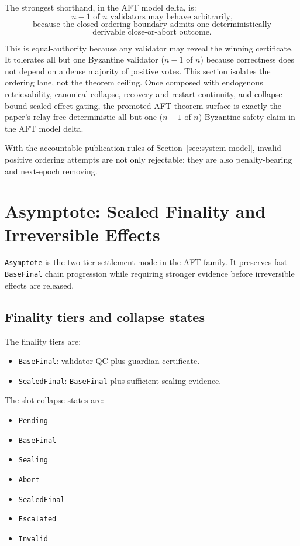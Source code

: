 \documentclass[11pt]{article}
\newcommand{\AFT}{\textsc{AFT}}
\newcommand{\code}[1]{\texttt{#1}}
\begin{document}
The strongest shorthand, in the AFT model delta, is:
\[
n-1 \text{ of } n \text{ validators may behave arbitrarily,}
\]
\[
\text{because the closed ordering boundary admits one deterministically}
\]
\[
\text{derivable close-or-abort outcome.}
\]

This is equal-authority because any validator may reveal the winning
certificate. It tolerates all but one Byzantine validator (\(n-1\) of \(n\))
because correctness does not
depend on a dense majority of positive votes. This section isolates the
ordering lane, not the theorem ceiling. Once composed with endogenous
retrievability, canonical collapse, recovery and restart continuity, and
collapse-bound sealed-effect gating, the promoted \AFT{} theorem surface is
exactly the paper's relay-free deterministic all-but-one (\(n-1\) of \(n\))
Byzantine safety
claim in the AFT model delta.

With the accountable publication rules of
Section~\ref{sec:system-model}, invalid positive ordering attempts are not only
rejectable; they are also penalty-bearing and next-epoch removing.

\section{Asymptote: Sealed Finality and Irreversible Effects}

\code{Asymptote} is the two-tier settlement mode in the \AFT{} family. It
preserves fast \code{BaseFinal} chain progression while requiring stronger
evidence before irreversible effects are released.

\subsection{Finality tiers and collapse states}

The finality tiers are:

\begin{itemize}[leftmargin=1.5em]
\item \code{BaseFinal}: validator QC plus guardian certificate.
\item \code{SealedFinal}: \code{BaseFinal} plus sufficient sealing evidence.
\end{itemize}

The slot collapse states are:

\begin{itemize}[leftmargin=1.5em]
\item \code{Pending}
\item \code{BaseFinal}
\item \code{Sealing}
\item \code{Abort}
\item \code{SealedFinal}
\item \code{Escalated}
\item \code{Invalid}
\end{itemize}
\end{document}
